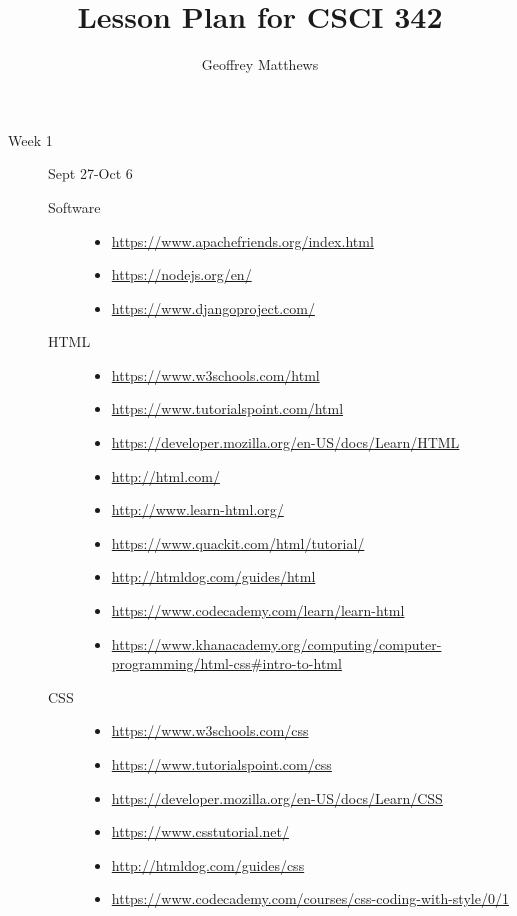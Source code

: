 \documentclass{article}
\title{Lesson Plan for CSCI 342}
\author{Geoffrey Matthews}
\begin{document}
\maketitle
\begin{description}
\item[Week 1] Sept 27-Oct 6
\begin{description}
\item[Software]\mbox{}
  \begin{itemize}
  \item\scriptsize\url{https://www.apachefriends.org/index.html}
  \item\scriptsize\url{https://nodejs.org/en/}
  \item\scriptsize\url{https://www.djangoproject.com/}
  \end{itemize}

\item[HTML]\mbox{}
  \begin{itemize}
  \item\scriptsize\url{https://www.w3schools.com/html}
  \item\scriptsize\url{https://www.tutorialspoint.com/html}
  \item\scriptsize\url{https://developer.mozilla.org/en-US/docs/Learn/HTML}
  \item\scriptsize\url{http://html.com/}
  \item\scriptsize\url{http://www.learn-html.org/}
  \item\scriptsize\url{https://www.quackit.com/html/tutorial/}
  \item\scriptsize\url{http://htmldog.com/guides/html}
  \item\scriptsize\url{https://www.codecademy.com/learn/learn-html}
  \item\scriptsize\url{https://www.khanacademy.org/computing/computer-programming/html-css#intro-to-html}
  \end{itemize}
  
\item[CSS]\mbox{}
  \begin{itemize}
  \item\scriptsize\url{https://www.w3schools.com/css}
  \item\scriptsize\url{https://www.tutorialspoint.com/css}
  \item\scriptsize\url{https://developer.mozilla.org/en-US/docs/Learn/CSS}
  \item\scriptsize\url{https://www.csstutorial.net/}
  \item\scriptsize\url{http://htmldog.com/guides/css}
  \item\scriptsize\url{https://www.codecademy.com/courses/css-coding-with-style/0/1}
  \end{itemize}
\end{description}



\end{description}
\end{document}
